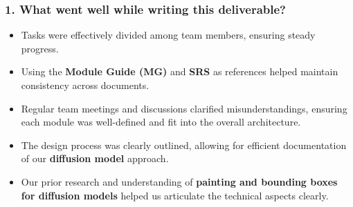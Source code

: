 \documentclass[12pt, titlepage]{article}
\begin{document}
\subsubsection{1. What went well while writing this deliverable?}
\begin{itemize}
    \item Tasks were effectively divided among team members, ensuring steady progress.
    \item Using the \textbf{Module Guide (MG)} and \textbf{SRS} as references helped maintain consistency across documents.
    \item Regular team meetings and discussions clarified misunderstandings, ensuring each module was well-defined and fit into the overall architecture.
    \item The design process was clearly outlined, allowing for efficient documentation of our \textbf{diffusion model} approach.
    \item Our prior research and understanding of \textbf{painting and bounding boxes for diffusion models} helped us articulate the technical aspects clearly.
\end{itemize}
\end{document}
